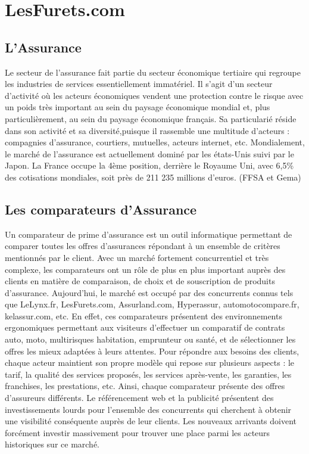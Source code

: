 \chapter{LesFurets.com}

\section{L'Assurance}
Le secteur de l’assurance fait partie du secteur économique tertiaire qui regroupe les industries de services essentiellement immatériel. Il s’agit d’un secteur d’activité où les acteurs économiques vendent une protection contre le risque avec un poids très important au sein du paysage économique mondial et, plus particulièrement, au sein du paysage économique français. Sa particularié réside dans son activité et sa diversité,puisque il rassemble une multitude d’acteurs : compagnies d’assurance, courtiers, mutuelles, acteurs internet, etc. Mondialement, le marché de l’assurance est actuellement dominé par les états-Unis suivi par le Japon. La France occupe la 4ème position, derrière le Royaume Uni, avec 6,5\% des cotisations mondiales, soit près de 211 235 millions d’euros. (FFSA et Gema)

\section{Les comparateurs d'Assurance} Un comparateur de prime d’assurance est un outil informatique permettant de comparer toutes les offres d’assurances répondant à un ensemble de critères mentionnés par le client. Avec un marché fortement concurrentiel et très complexe, les comparateurs ont un rôle de plus en plus important auprès des clients en matière de comparaison, de choix et de souscription de produits d’assurance. Aujourd’hui, le marché est occupé par des concurrents connus tels que LeLynx.fr, LesFurets.com, Assurland.com, Hyperassur, automotocompare.fr, kelassur.com, etc. En effet, ces comparateurs présentent des environnements ergonomiques permettant aux visiteurs d’effectuer un comparatif de contrats auto, moto, multirisques habitation, emprunteur ou santé, et de sélectionner les offres les mieux adaptées à leurs attentes. Pour répondre aux besoins des clients, chaque acteur maintient son propre modèle qui repose sur plusieurs aspects : le tarif, la qualité des services proposés, les services après-vente, les garanties, les franchises, les prestations, etc. Ainsi, chaque comparateur présente des offres d’assureurs différents. Le référencement web et la publicité
présentent des investissements lourds pour l’ensemble des concurrents qui cherchent à obtenir une visibilité conséquente auprès de leur clients. Les nouveaux arrivants doivent forcément investir massivement pour trouver une place parmi les acteurs historiques sur ce marché.

